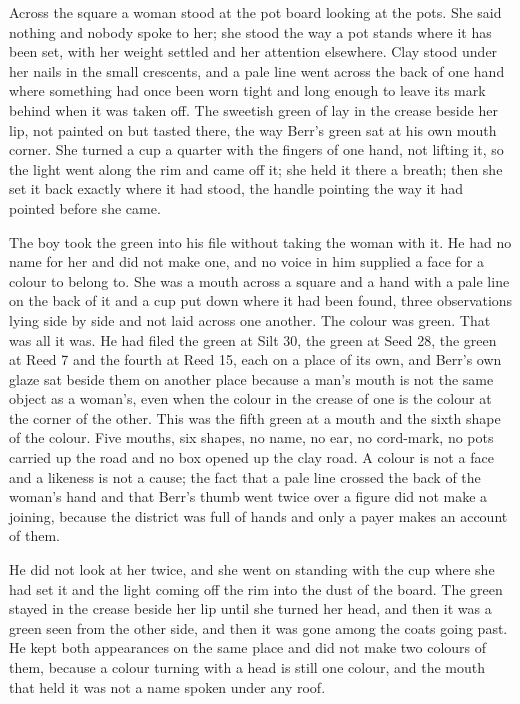 \scenebreak

Across the square a woman stood at the pot board looking at the pots. She said nothing and nobody spoke to her; she stood the way a pot stands where it has been set, with her weight settled and her attention elsewhere. Clay stood under her nails in the small crescents, and a pale line went across the back of one hand where something had once been worn tight and long enough to leave its mark behind when it was taken off. The sweetish green of  lay in the crease beside her lip, not painted on but tasted there, the way Berr's green sat at his own mouth corner. She turned a cup a quarter with the fingers of one hand, not lifting it, so the light went along the rim and came off it; she held it there a breath; then she set it back exactly where it had stood, the handle pointing the way it had pointed before she came.

The boy took the green into his file without taking the woman with it. He had no name for her and did not make one, and no voice in him supplied a face for a colour to belong to. She was a mouth across a square and a hand with a pale line on the back of it and a cup put down where it had been found, three observations lying side by side and not laid across one another. The colour was green. That was all it was. He had filed the green at Silt 30, the green at Seed 28, the green at Reed 7 and the fourth at Reed 15, each on a place of its own, and Berr's own glaze sat beside them on another place because a man's mouth is not the same object as a woman's, even when the colour in the crease of one is the colour at the corner of the other. This was the fifth green at a mouth and the sixth shape of the colour. Five mouths, six shapes, no name, no ear, no cord-mark, no pots carried up the road and no box opened up the clay road. A colour is not a face and a likeness is not a cause; the fact that a pale line crossed the back of the woman's hand and that Berr's thumb went twice over a figure did not make a joining, because the district was full of hands and only a payer makes an account of them.

He did not look at her twice, and she went on standing with the cup where she had set it and the light coming off the rim into the dust of the board. The green stayed in the crease beside her lip until she turned her head, and then it was a green seen from the other side, and then it was gone among the coats going past. He kept both appearances on the same place and did not make two colours of them, because a colour turning with a head is still one colour, and the mouth that held it was not a name spoken under any roof.

